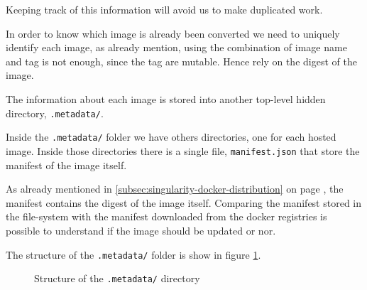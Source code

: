 Keeping track of this information will avoid us to make duplicated work.

In order to know which image is already been converted we need to uniquely identify each image, as already mention, using the combination of image name and tag is not enough, since the tag are mutable.
Hence rely on the digest of the image.

The information about each image is stored into another top-level hidden directory, \texttt{.metadata/}.

Inside the \texttt{.metadata/} folder we have others directories, one for each hosted image.
Inside those directories there is a single file, \texttt{manifest.json} that store the manifest of the image itself.

As already mentioned in \ref{subsec:singularity-docker-distribution} on page \pageref{subsec:singularity-docker-distribution}, the manifest contains the digest of the image itself.
Comparing the manifest stored in the file-system with the manifest downloaded from the docker registries is possible to understand if the image should be updated or nor.

The structure of the \texttt{.metadata/} folder is show in figure \ref{fig:metadata-folder-structure}.

\begin{figure}
\caption{Structure of the \texttt{.metadata/} directory}
\label{fig:metadata-folder-structure}
\end{figure}



